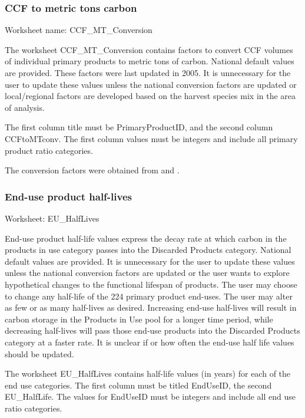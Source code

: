 \documentclass[
  openany]{book}
\begin{document}
\hypertarget{own-prov-input-ccfMTC}{%
\subsubsection{CCF to metric tons carbon}\label{own-prov-input-ccfMTC}}

Worksheet name: CCF\_MT\_Conversion

The worksheet CCF\_MT\_Conversion contains factors to convert CCF volumes of individual primary products to metric tons of carbon. National default values are provided. These factors were last updated in 2005. It is unnecessary for the user to update these values unless the national conversion factors are updated or local/regional factors are developed based on the harvest species mix in the area of analysis.

The first column title must be PrimaryProductID, and the second column CCFtoMTconv. The first column values must be integers and include all primary product ratio categories.

The conversion factors were obtained from \textcite{smith2006} and \textcite{skog2008}.

\hypertarget{own-prov-input-euhl}{%
\subsubsection{End-use product half-lives}\label{own-prov-input-euhl}}

Worksheet: EU\_HalfLives

End-use product half-life values express the decay rate at which carbon in the products in use category passes into the Discarded Products category. National default values are provided. It is unnecessary for the user to update these values unless the national conversion factors are updated or the user wants to explore hypothetical changes to the functional lifespan of products. The user may choose to change any half-life of the 224 primary product end-uses. The user may alter as few or as many half-lives as desired. Increasing end-use half-lives will result in carbon storage in the Products in Use pool for a longer time period, while decreasing half-lives will pass those end-use products into the Discarded Products category at a faster rate. It is unclear if or how often the end-use half life values should be updated.

The worksheet EU\_HalfLives contains half-life values (in years) for each of the end use categories. The first column must be titled EndUseID, the second EU\_HalfLife. The values for EndUseID must be integers and include all end use ratio categories.
\end{document}
